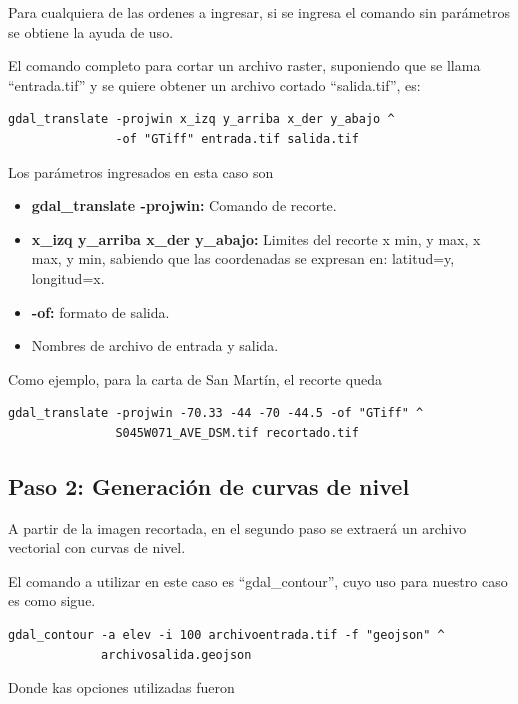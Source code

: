 \documentclass[12pt,]{extarticle}
\begin{document}
Para cualquiera de las ordenes a ingresar, si se ingresa el comando sin
parámetros se obtiene la ayuda de uso.

El comando completo para cortar un archivo raster, suponiendo que se
llama ``entrada.tif'' y se quiere obtener un archivo cortado
``salida.tif'', es:

\begin{verbatim}
gdal_translate -projwin x_izq y_arriba x_der y_abajo ^
               -of "GTiff" entrada.tif salida.tif
\end{verbatim}

Los parámetros ingresados en esta caso son

\begin{itemize}
\item
  \textbf{gdal\_translate -projwin:} Comando de recorte.
\item
  \textbf{x\_izq y\_arriba x\_der y\_abajo:} Limites del recorte x min,
  y max, x max, y min, sabiendo que las coordenadas se expresan en:
  latitud=y, longitud=x.
\item
  \textbf{-of:} formato de salida.
\item
  Nombres de archivo de entrada y salida.
\end{itemize}

Como ejemplo, para la carta de San Martín, el recorte queda

\begin{verbatim}
gdal_translate -projwin -70.33 -44 -70 -44.5 -of "GTiff" ^
               S045W071_AVE_DSM.tif recortado.tif
\end{verbatim}

\hypertarget{paso-2-generaciuxf3n-de-curvas-de-nivel}{%
\subsection{Paso 2: Generación de curvas de
nivel}\label{paso-2-generaciuxf3n-de-curvas-de-nivel}}

A partir de la imagen recortada, en el segundo paso se extraerá un
archivo vectorial con curvas de nivel.

El comando a utilizar en este caso es ``gdal\_contour'', cuyo uso para
nuestro caso es como sigue.

\begin{verbatim}
gdal_contour -a elev -i 100 archivoentrada.tif -f "geojson" ^
             archivosalida.geojson
\end{verbatim}

Donde kas opciones utilizadas fueron
\end{document}
